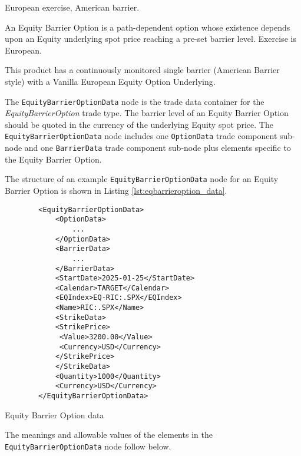 \else

European exercise, American barrier.

An Equity Barrier Option is a path-dependent option whose existence depends upon an Equity underlying
spot price reaching a pre-set barrier level. Exercise is European.

This product has a continuously monitored single barrier (American Barrier style) with a Vanilla
European Equity Option Underlying.

\fi

The \lstinline!EquityBarrierOptionData!  node is the trade data container for the \emph{EquityBarrierOption} trade type. The barrier level of an Equity Barrier Option should be quoted in the currency of 
the underlying Equity spot price. The \lstinline!EquityBarrierOptionData!  node includes one  \lstinline!OptionData! trade component sub-node and one \lstinline!BarrierData! trade component sub-node plus elements
specific to the Equity Barrier Option. 

The structure of an example \lstinline!EquityBarrierOptionData! node for an Equity Barrier Option is shown in Listing
\ref{lst:eqbarrieroption_data}.

\begin{listing}[H]
\begin{verbatim}
        <EquityBarrierOptionData>
            <OptionData>
                ...
            </OptionData>
            <BarrierData>
                ...
            </BarrierData>
            <StartDate>2025-01-25</StartDate>
            <Calendar>TARGET</Calendar>
            <EQIndex>EQ-RIC:.SPX</EQIndex>            
            <Name>RIC:.SPX</Name>
            <StrikeData>
            <StrikePrice>
             <Value>3200.00</Value>
             <Currency>USD</Currency>
            </StrikePrice>
            </StrikeData>
            <Quantity>1000</Quantity>
            <Currency>USD</Currency>
        </EquityBarrierOptionData>
\end{verbatim}
\caption{Equity Barrier Option data}
\label{lst:eqbarrieroption_data}
\end{listing}

The meanings and allowable values of the elements in the \lstinline!EquityBarrierOptionData!  node follow below.

